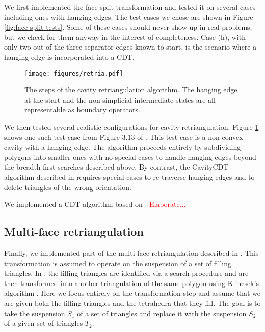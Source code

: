 \documentclass[twocolumn]{article}
\begin{document}
We first implemented the face-split transformation and tested it on several cases including ones with hanging edges.
The test cases we chose are shown in Figure \ref{fig:face-split-tests}.
Some of these cases should never show up in real problems, but we check for them anyway in the interest of completeness.
Case (h), with only two out of the three separator edges known to start, is the scenario where a hanging edge is incorporated into a CDT.

\begin{figure}
    \begin{center}
    \texttt{[image: figures/retria.pdf]}
    \end{center}
    \caption{The steps of the cavity retriangulation algorithm.
    The hanging edge at the start and the non-simplicial intermediate states are all representable as boundary operators.}
    \label{fig:cheng-dey-shewchuk-example}
\end{figure}

We then tested several realistic configurations for cavity retriangulation.
Figure \ref{fig:cheng-dey-shewchuk-example} shows one such test case from Figure 3.13 of \cite{cheng2013delaunay}.
This test case is a non-convex cavity with a hanging edge.
The algorithm proceeds entirely by subdividing polygons into smaller ones with no special cases to handle hanging edges beyond the breadth-first searches described above.
By contrast, the CavityCDT algorithm described in \cite{cheng2013delaunay} requires special cases to re-traverse hanging edges and to delete triangles of the wrong orientation.

We implemented a CDT algorithm based on \cite{anglada1997improved}.
\textcolor{red}{Elaborate...}

\subsection{Multi-face retriangulation}

Finally, we implemented part of the multi-face retriangulation described in \cite{misztal2009tetrahedral}.
This transformation is assumed to operate on the suspension of a set of filling triangles.
In \cite{misztal2009tetrahedral}, the filling triangles are identified via a search procedure and are then transformed into another triangulation of the same polygon using Klincsek's algorithm \cite{klincsek1980minimal}.
Here we focus entirely on the transformation step and assume that we are given both the filling triangles and the tetrahedra that they fill.
The goal is to take the suspension $S_1$ of a set of triangles and replace it with the suspension $S_2$ of a given set of triangles $T_2$.
\end{document}
